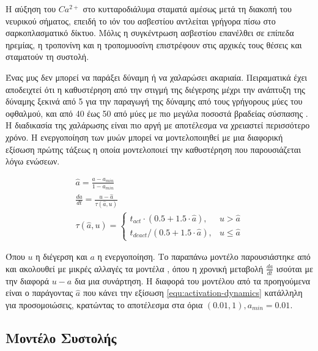 Η αύξηση του $Ca^{2+}$ στο κυτταροδιάλυμα σταματά αμέσως μετά τη διακοπή του νευρικού σήματος, επειδή το ιόν του ασβεστίου αντλείται γρήγορα πίσω στο σαρκοπλασματικό δίκτυο. Μόλις η συγκέντρωση ασβεστίου επανέλθει σε επίπεδα ηρεμίας, η τροπονίνη και η τροπομυοσίνη επιστρέφουν στις αρχικές τους θέσεις και σταματούν τη συστολή.

Ένας μυς δεν μπορεί να παράξει δύναμη ή να χαλαρώσει ακαριαία. Πειραματικά έχει αποδειχτεί ότι η καθυστέρηση από την στιγμή της διέγερσης μέχρι την ανάπτυξη της δύναμης ξεκινά από 5 για την παραγωγή της δύναμης από τους γρήγορους μύες του οφθαλμού, και από 40 έως 50 από μύες με πιο μεγάλα ποσοστά βραδείας σύσπασης \cite{zajac89}. Η διαδικασία της χαλάρωσης είναι πιο αργή με αποτέλεσμα να χρειαστεί περισσότερο χρόνο. Η ενεργοποίηση των μυών μπορεί να μοντελοποιηθεί με μια διαφορική εξίσωση πρώτης τάξεως η οποία μοντελοποιεί την καθυστέρηση που παρουσιάζεται λόγω ενώσεων.

\begin{equation}
    \begin{gathered}
        \hat{a} = \frac{a - a_{min}}{1 - a_{min}}\\[10pt]
        \frac{da}{dt} = \frac{u - \hat{a}}{\tau (\hat{a}, u)}\\[10pt]
        \tau (\hat{a}, u) =
        \begin{cases}
            t_{act} \cdot (0.5 +1.5 \cdot \hat{a}), & u > \hat{a} \\
            t_{deact}/(0.5 +1.5 \cdot \hat{a}), & u \leq \hat{a}
        \end{cases}
    \end{gathered}
    \label{equ:activation-dynamics}
\end{equation}

Όπου $u$ η διέγερση και $a$ η ενεργοποίηση. Το παραπάνω μοντέλο παρουσιάστηκε από \cite{millard13} και ακολουθεί με μικρές αλλαγές τα μοντέλα \cite{thelen03, winters95}, όπου η χρονική μεταβολή $\frac{da}{dt}$ ισούται με την διαφορά $u - a$ δια μια συνάρτηση. Η διαφορά του μοντέλου από τα προηγούμενα είναι ο παράγοντας $\hat{a}$ που κάνει την εξίσωση \ref{equ:activation-dynamics} κατάλληλη για προσομοιώσεις, κρατώντας το αποτέλεσμα στα όρια $(0.01, 1), a_{min} = 0.01$.

\subsection{Μοντέλο Συστολής}
\label{subsec:muscle-model}

